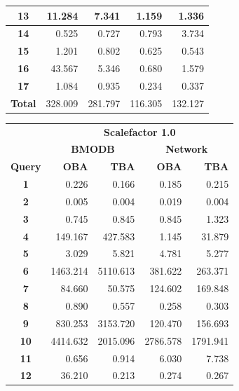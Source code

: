 \documentclass[a4paper]{article}
\begin{document}
\begin{figure}[h]
\begin{minipage}{0.5\linewidth}
\begin{tiny}
\begin{tabular}{|c|r|r|r|r|}
        \hline
        \textbf{13}&11.284&7.341&1.159&1.336\\
        \hline
        \textbf{14}&0.525&0.727&0.793&3.734\\
        \hline
        \textbf{15}&1.201&0.802&0.625&0.543\\
        \hline
        \textbf{16}&43.567&5.346&0.680&1.579\\
        \hline
        \textbf{17}&1.084&0.935&0.234&0.337\\
        \hline
        \textbf{Total}&328.009&281.797&116.305&132.127\\
        \hline
      \end{tabular}
    \end{tiny}
  \end{minipage} \hfill
\begin{minipage}{0.5\linewidth}
    \begin{tiny}
      \begin{tabular}{|c|r|r|r|r|}
        \hline
        &\multicolumn{4}{c|}{\textbf{Scalefactor 1.0}}\\
        \cline{2-5}
        &\multicolumn{2}{c|}{\textbf{BMODB}}&\multicolumn{2}{c|}{\textbf{Network}}\\
        \hline
        \textbf{Query}&\textbf{OBA}&\textbf{TBA}&\textbf{OBA}&\textbf{TBA}\\
        \hline
        \textbf{1}&0.226&0.166&0.185&0.215\\
        \hline
        \textbf{2}&0.005&0.004&0.019&0.004\\
        \hline
        \textbf{3}&0.745&0.845&0.845&1.323\\
        \hline
        \textbf{4}&149.167&427.583&1.145&31.879\\
        \hline
         \textbf{5}&3.029&5.821&4.781&5.277\\
        \hline
        \textbf{6}&1463.214&5110.613&381.622&263.371\\
        \hline
        \textbf{7}&84.660&50.575&124.602&169.848\\
        \hline
        \textbf{8}&0.890&0.557&0.258&0.303\\
        \hline
        \textbf{9}&830.253&3153.720&120.470&156.693\\
        \hline
        \textbf{10}&4414.632&2015.096&2786.578&1791.941\\
        \hline
        \textbf{11}&0.656&0.914&6.030&7.738\\
        \hline
        \textbf{12}&36.210&0.213&0.274&0.267\\

\end{tabular}
\end{tiny}
\end{minipage}
\end{figure}
\end{document}
